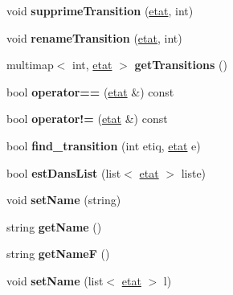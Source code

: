 \begin{DoxyCompactItemize}
\item 
\hypertarget{classetat_a87328ea8752e2396ac15f2465f2ff315}{void {\bfseries supprime\-Transition} (\hyperlink{classetat}{etat}, int)}\label{classetat_a87328ea8752e2396ac15f2465f2ff315}

\item 
\hypertarget{classetat_a8e195072b1adca99801b6a4a432eb9f8}{void {\bfseries rename\-Transition} (\hyperlink{classetat}{etat}, int)}\label{classetat_a8e195072b1adca99801b6a4a432eb9f8}

\item 
\hypertarget{classetat_acc168f9b970e301d65e72cf1f4ee9062}{multimap$<$ int, \hyperlink{classetat}{etat} $>$ {\bfseries get\-Transitions} ()}\label{classetat_acc168f9b970e301d65e72cf1f4ee9062}

\item 
\hypertarget{classetat_a0a1950caa3737139ea5dc29c600e842d}{bool {\bfseries operator==} (\hyperlink{classetat}{etat} \&) const }\label{classetat_a0a1950caa3737139ea5dc29c600e842d}

\item 
\hypertarget{classetat_ab6f5ff8cf0dadb8b9be06095ae3b2c49}{bool {\bfseries operator!=} (\hyperlink{classetat}{etat} \&) const }\label{classetat_ab6f5ff8cf0dadb8b9be06095ae3b2c49}

\item 
\hypertarget{classetat_acab203fc095b3974136c4f73895df9a6}{bool {\bfseries find\-\_\-transition} (int etiq, \hyperlink{classetat}{etat} e)}\label{classetat_acab203fc095b3974136c4f73895df9a6}

\item 
\hypertarget{classetat_a381028a7a37e890734c1cc4afe05bd55}{bool {\bfseries est\-Dans\-List} (list$<$ \hyperlink{classetat}{etat} $>$ liste)}\label{classetat_a381028a7a37e890734c1cc4afe05bd55}

\item 
\hypertarget{classetat_a65ef0b41b54bbf36b5dab8071822171d}{void {\bfseries set\-Name} (string)}\label{classetat_a65ef0b41b54bbf36b5dab8071822171d}

\item 
\hypertarget{classetat_a938d2165beabfb6de3ad16e2a15b05c5}{string {\bfseries get\-Name} ()}\label{classetat_a938d2165beabfb6de3ad16e2a15b05c5}

\item 
\hypertarget{classetat_a37ee0f6502f471dd3566733f8a1bc8fe}{string {\bfseries get\-Name\-F} ()}\label{classetat_a37ee0f6502f471dd3566733f8a1bc8fe}

\item 
\hypertarget{classetat_a87882f3b4b4e3bae6b7a22008241d836}{void {\bfseries set\-Name} (list$<$ \hyperlink{classetat}{etat} $>$ l)}\label{classetat_a87882f3b4b4e3bae6b7a22008241d836}

\end{DoxyCompactItemize}
